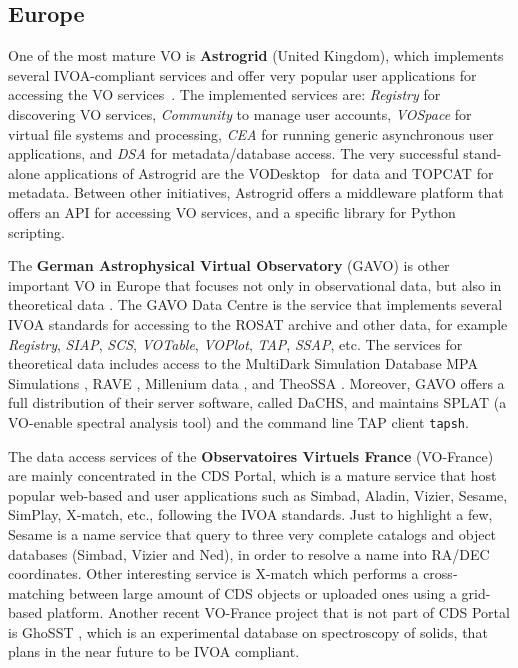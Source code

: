 \subsection{Europe}

One of the most mature VO is \textbf{Astrogrid} (United Kingdom), which implements
several IVOA-compliant services and offer very popular user applications
for accessing the VO services~\cite{}.
The implemented services are: \emph{Registry}
for discovering VO services, \emph{Community} to manage user accounts, 
\emph{VOSpace} for virtual file systems and processing, \emph{CEA} for running
generic asynchronous user applications, and \emph{DSA} for metadata/database
access. The very successful stand-alone applications of Astrogrid are 
the VODesktop~\cite{} for data and
TOPCAT \cite{} for metadata.
Between other initiatives, Astrogrid offers a middleware platform 
that offers an API for accessing VO services, and a specific 
library for Python scripting.

The \textbf{German Astrophysical Virtual Observatory} (GAVO) is other important VO in Europe that focuses not
only in observational data, but also in theoretical data \cite{}.
The GAVO Data Centre is the service that implements several IVOA standards for 
accessing to the ROSAT archive and other data, for example 
\emph{Registry}, \emph{SIAP}, \emph{SCS}, \emph{VOTable}, \emph{VOPlot}, 
\emph{TAP}, \emph{SSAP}, etc. The services for 
theoretical data includes access to the MultiDark Simulation Database \cite{}
MPA Simulations \cite{},
RAVE \cite{},
Millenium data \cite{},
and TheoSSA \cite{}.
Moreover, GAVO offers a full distribution of their server software, called
DaCHS, and maintains SPLAT (a VO-enable spectral analysis tool) and the command line TAP
client \texttt{tapsh}.


The data access services of the \textbf{Observatoires Virtuels France}
(VO-France) are mainly concentrated in the 
CDS Portal, which is a mature service that host popular web-based and
user applications such as Simbad, Aladin, Vizier, Sesame, SimPlay, X-match,
etc., following the IVOA standards. 
Just to highlight a few, Sesame is a name service that query to 
three very complete catalogs and object databases (Simbad, Vizier and Ned),
in order to resolve a name into RA/DEC coordinates. Other interesting 
service is X-match which performs a cross-matching between large amount
of CDS objects or uploaded ones using a grid-based platform.
Another recent VO-France project that is not part of CDS Portal 
is GhoSST \cite{},
which is an experimental database on spectroscopy of solids, that
plans in the near future to be IVOA compliant.

